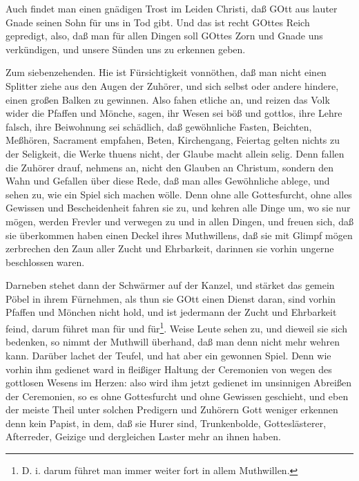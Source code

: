 Auch findet man einen gnädigen Trost im Leiden Christi, daß GOtt aus lauter Gnade seinen Sohn für uns in Tod gibt. Und das ist recht GOttes Reich gepredigt, also, daß man für allen Dingen soll GOttes
Zorn und Gnade uns verkündigen, und unsere Sünden uns zu erkennen geben.

Zum siebenzehenden. Hie ist Fürsichtigkeit vonnöthen, daß man nicht einen Splitter ziehe aus den Augen der Zuhörer, und sich selbst oder andere hindere, einen großen Balken zu gewinnen. Also fahen etliche an, und reizen das Volk wider die Pfaffen und Mönche, sagen, ihr Wesen sei böß und gottlos, ihre Lehre falsch, ihre Beiwohnung sei schädlich, daß gewöhnliche Fasten, Beichten, Meßhören, Sacrament empfahen, Beten, Kirchengang, Feiertag gelten nichts zu der Seligkeit, die Werke thuens nicht, der Glaube macht allein selig. Denn fallen die Zuhörer drauf, nehmens an, nicht den Glauben an Christum, sondern den Wahn und Gefallen über diese Rede, daß man alles Gewöhnliche ablege, und sehen zu, wie ein Spiel sich machen wölle. Denn ohne alle Gottesfurcht, ohne alles Gewissen und Bescheidenheit fahren sie zu, und kehren alle Dinge um, wo sie nur mögen, werden Frevler und verwegen zu und in allen Dingen, und freuen sich, daß sie überkommen haben einen Deckel ihres Muthwillens, daß sie mit Glimpf mögen zerbrechen den Zaun aller Zucht und Ehrbarkeit, darinnen sie vorhin ungerne beschlossen waren.

Darneben stehet dann der Schwärmer auf der Kanzel, und stärket das gemein Pöbel in ihrem Fürnehmen, als thun sie GOtt einen Dienst daran, sind vorhin Pfaffen und Mönchen nicht hold, und ist jedermann der Zucht und Ehrbarkeit feind, darum führet man für und für\footnote{D. i. darum führet man immer weiter fort in allem Muthwillen.}. Weise Leute sehen zu, und dieweil sie sich bedenken, so nimmt der Muthwill überhand, daß man denn nicht mehr wehren kann. Darüber lachet der Teufel, und hat aber ein gewonnen Spiel. Denn wie vorhin ihm gedienet ward in fleißiger
Haltung der Ceremonien von wegen des gottlosen Wesens im Herzen: also wird ihm jetzt gedienet im unsinnigen Abreißen der Ceremonien, so es ohne Gottesfurcht und ohne Gewissen geschieht, und eben der meiste Theil unter solchen Predigern und Zuhörern Gott weniger erkennen denn kein Papist, in dem, daß sie Hurer sind, Trunkenbolde, Gotteslästerer, Afterreder, Geizige und dergleichen Laster mehr an ihnen haben.

